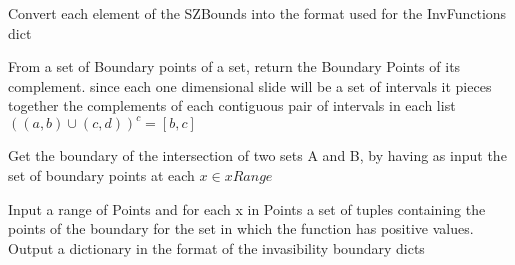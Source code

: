 \documentclass[letterpaper,10pt,english]{sphinxmanual}
\begin{document}

\begin{fulllineitems}
\label{Analisis/Auxiliaryfunctions:Auxiliaryfunctions.FormatZones}
Convert each element of the SZBounds into the format used for the InvFunctions dict

\end{fulllineitems}


\begin{fulllineitems}
\label{Analisis/Auxiliaryfunctions:Auxiliaryfunctions.GetComplement}
From a set of Boundary points of a set, return the Boundary Points of its complement. since each one dimensional slide will be a set of intervals it pieces together the complements of each contiguous pair of intervals in each list \(((a,b) \cup (c,d))^c = [b,c]\)

\end{fulllineitems}


\begin{fulllineitems}
\label{Analisis/Auxiliaryfunctions:Auxiliaryfunctions.GetIntersection}
Get the boundary of the intersection of two sets A and B, by having as input the set of boundary points at each \(x \in xRange\)

\end{fulllineitems}


\begin{fulllineitems}
\label{Analisis/Auxiliaryfunctions:Auxiliaryfunctions.GetPositiveBoundaries}
Input a range of Points and for each x in Points a set of tuples containing 
the points of the boundary for the set in which the function has positive
values.
Output a dictionary in the format of the invasibility boundary dicts

\end{fulllineitems}
\end{document}
